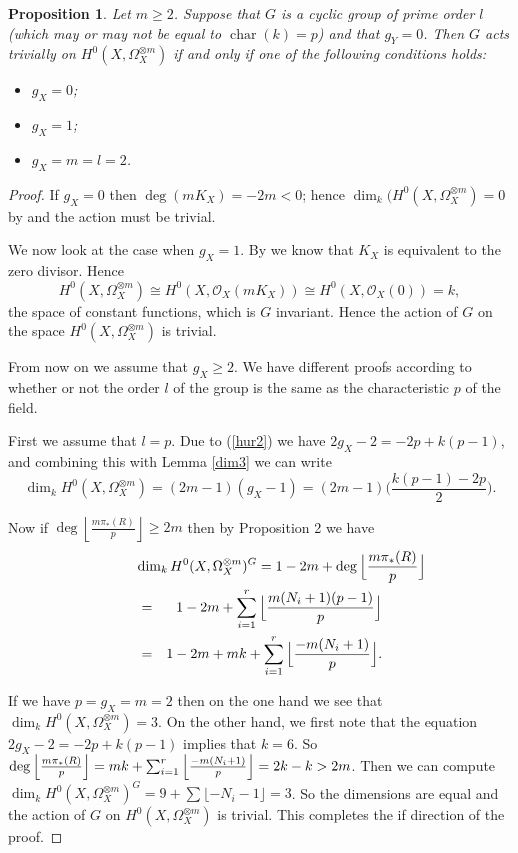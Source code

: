 \documentclass[11pt]{article} %
\newtheorem{prop}{Proposition}
\theoremstyle{remark}\newtheorem*{rem}{Remark}
\DeclareMathOperator{\cha}{char}
\begin{document}
  \begin{prop}\label{triv}
    Let $m \geq 2$. 
    Suppose that $G$ is a cyclic group of prime order $l$ (which may or may not be equal to $\cha(k)=p$) and that $g_Y=0$. 
    Then $G$ acts trivially on $H^0(X,\Omega_X^{\otimes m})$ if and only if one of the following conditions holds:
      \begin{itemize}
	\item $g_X=0$;
	\item $g_X=1$;
	\item $g_X=m=l=2$.
      \end{itemize}
  \end{prop}
\begin{proof}
    If $g_X=0$ then $\deg(mK_X)=-2m<0$; hence $\dim_k(H^0(X,\Omega_X^{\otimes m})=0$ by \cite[{\S} 8, Prop. 3]{fulton} and the action must be trivial.

    We now look at the case when $g_X=1$. By \cite[Chap. IV,\ Example 1.3.6]{hart} we know that $K_X$ is equivalent to the zero divisor. 
    Hence 
      \[
	H^0(X,\Omega_X^{\otimes m})\cong H^0(X,\mathscr{O}_X(mK_X)) \cong H^0(X,\mathscr{O}_X(0))=k,
      \]
    the space of constant functions, which is $G$ invariant. 
    Hence the action of $G$ on the space $H^0(X,\Omega_X^{\otimes m})$ is trivial.

    From now on we assume that $g_X\geq 2$. 
    We have different proofs according to whether or not the order $l$ of the group is the same as the characteristic $p$ of the field.


	First we assume that $l=p$. 
	Due to (\ref{hur2}) we have $2g_X-2=-2p+k(p-1)$, and combining this with Lemma \ref{dim3} we can write
		\[
		\dim_kH^0(X,\Omega_X^{\otimes m})=(2m-1)(g_X-1)=(2m-1)\Big(\frac{k(p-1)-2p}{2}\Big).
		\]

	Now if $\deg\left \lfloor{\frac{m\pi_*(R)}{p}}\right\rfloor\geq 2m$ then by Proposition 2 we have
		\begin{eqnarray*}	
			\lefteqn{\dim_kH^0(X,\Omega_X^{\otimes m})^G = 1-2m+\deg\Big{\lfloor}{\frac{m\pi_*(R)}{p}}\Big{\rfloor}} \\
			&= & 1-2m+\sum_{i=1}^r \Big{\lfloor}{\frac{m(N_i+1)(p-1)}{p}}\Big{\rfloor} \\
			&= & 1-2m+mk+\sum_{i=1}^r\Big{\lfloor}{\frac{-m(N_i+1)}{p}}\Big{\rfloor}. 
		\end{eqnarray*}
	
	If we have $p=g_X=m=2$ then on the one hand we see that $\dim_kH^0(X,\Omega_X^{\otimes m})=3$. 
	On the other hand, we first note that the equation $2g_X-2=-2p+k(p-1)$ implies that $k=6$. 
	So $\deg\left\lfloor \frac{m\pi_*(R)}{p}\right\rfloor=mk+\sum_{i=1}^r\Big{\lfloor}{\frac{-m(N_i+1)}{p}}\Big{\rfloor}=2k-k>2m$. 	
	Then we can compute $\dim_kH^0(X,\Omega_X^{\otimes m})^G=9+\sum\lfloor-N_i-1\rfloor=3$. 
	So the dimensions are equal and the action of $G$ on $H^0(X,\Omega_X^{\otimes m})$ is trivial. 
	This completes the if direction of the proof.


\end{proof}
\end{document}
